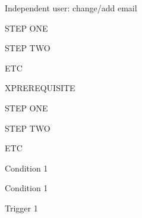 \begin{uc}{Independent user: change/add email}

    \begin{uc-mss}
    \item STEP ONE
    \item STEP TWO
    \item ETC
    \end{uc-mss}

    \begin{uc-ext}

        \begin{uc-fail}{X}{PREREQUISITE}
        \item STEP ONE
        \item STEP TWO
        \item ETC
        \end{uc-fail}

    \end{uc-ext}

    \begin{uc-pre}
    \item Condition 1
    \end{uc-pre}

    \begin{uc-post}
    \item Condition 1
    \end{uc-post}

    \begin{uc-trig}
    \item Trigger 1
    \end{uc-trig}

\end{uc}